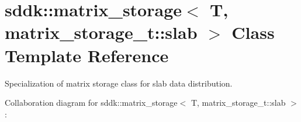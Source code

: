 \hypertarget{classsddk_1_1matrix__storage_3_01_t_00_01matrix__storage__t_1_1slab_01_4}{}\section{sddk\+:\+:matrix\+\_\+storage$<$ T, matrix\+\_\+storage\+\_\+t\+:\+:slab $>$ Class Template Reference}
\label{classsddk_1_1matrix__storage_3_01_t_00_01matrix__storage__t_1_1slab_01_4}


Specialization of matrix storage class for slab data distribution.  




Collaboration diagram for sddk\+:\+:matrix\+\_\+storage$<$ T, matrix\+\_\+storage\+\_\+t\+:\+:slab $>$\+:
